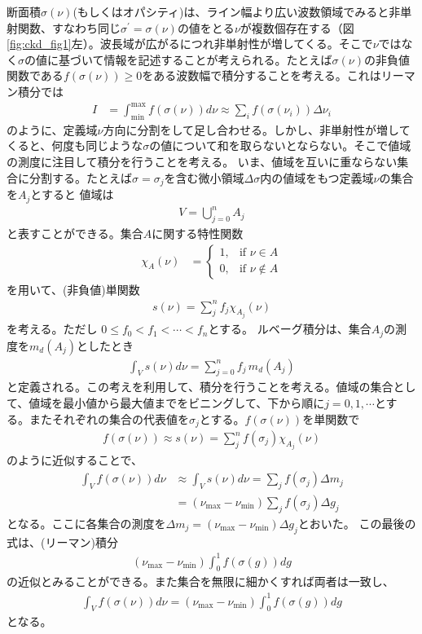 断面積$\sigma(\nu)$(もしくはオパシティ)は、ライン幅より広い波数領域でみると非単射関数、すなわち同じ$\sigma^\prime = \sigma (\nu)$の値をとる$\nu$が複数個存在する（図\ref{fig:ckd_fig1}左）。波長域が広がるにつれ非単射性が増してくる。そこで$\nu$ではなく$\sigma$の値に基づいて情報を記述することが考えられる。たとえば$\sigma(\nu)$の非負値関数である$f(\sigma(\nu)) \geq 0$をある波数幅で積分することを考える。これはリーマン積分では
\begin{align}
 I &= \int_\mathrm{min}^\mathrm{max} f(\sigma(\nu)) d \nu \approx  \sum_i f(\sigma(\nu_i)) \Delta \nu_i
\end{align}
のように、定義域$\nu$方向に分割をして足し合わせる。しかし、非単射性が増してくると、何度も同じような$\sigma$の値について和を取らないとならない。そこで値域の測度に注目して積分を行うことを考える。
いま、値域を互いに重ならない集合に分割する。たとえば$\sigma = \sigma_j$を含む微小領域$\Delta \sigma$内の値域をもつ定義域$\nu$の集合を$A_j$とすると
値域は
\begin{align}
    V = \bigcup_{j=0}^{n} A_j
\end{align}
と表すことができる。集合$A$に関する特性関数
\begin{align}
   \chi_A (\nu) &= \begin{cases}
  1, & \text{if } \nu \in A \\
  0, & \text{if } \nu \notin A
\end{cases}
\end{align}
を用いて、(非負値)単関数
\begin{align}
    s(\nu) = \sum_j^n f_j \chi_{A_j}(\nu)
\end{align}
を考える。ただし $0 \leq f_0 < f_1 < \cdots < f_n$とする。 ルベーグ積分は、集合$A_j$の測度を$m_d (A_j)$としたとき
\begin{align}
    \int_V s(\nu) d \nu = \sum_{j=0}^n f_j \, m_d (A_j)
\end{align}
と定義される。この考えを利用して、積分を行うことを考える。値域の集合として、値域を最小値から最大値までをビニングして、下から順に$j=0,1,\cdots$とする。またそれぞれの集合の代表値を$\sigma_j$とする。$f(\sigma(\nu))$を単関数で
\begin{align}
    f(\sigma(\nu)) \approx s(\nu) = \sum_j^n f(\sigma_j) \chi_{A_j}(\nu)
\end{align}
のように近似することで、
\begin{align}
 \int_V f(\sigma(\nu)) d \nu &\approx \int_V s(\nu) d \nu = \sum_j f(\sigma_j) \Delta m_j \\
 &= (\nu_\mathrm{max} - \nu_\mathrm{min}) \sum_j f(\sigma_j) \Delta g_j 
\end{align}
となる。ここに各集合の測度を$\Delta m_j = (\nu_\mathrm{max} - \nu_\mathrm{min}) \Delta g_j$とおいた。
この最後の式は、(リーマン)積分
\begin{align}
(\nu_\mathrm{max} - \nu_\mathrm{min}) \int_0^1 f(\sigma(g)) dg 
\end{align}
の近似とみることができる。また集合を無限に細かくすれば両者は一致し、
\begin{align}
\label{eq:Lebesgue}
\int_V f(\sigma(\nu)) d \nu = (\nu_\mathrm{max} - \nu_\mathrm{min}) \int_0^1 f(\sigma(g)) dg 
\end{align}
となる。

